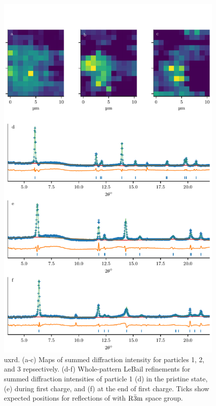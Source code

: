 \documentclass{article}
\begin{document}
\begin{figure}
  \centering
  \includegraphics{figures/NCA-particles-refined.pdf}
  \caption{\nca{} \gls{uxrd}. (a-c) Maps of summed diffraction
    intensity for particles 1, 2, and 3 repsectively. (d-f)
    Whole-pattern LeBail refinements for summed diffraction intensities
    of particle 1 (d) in the pristine state, (e) during first charge,
    and (f) at the end of first charge. Ticks show expected positions
    for reflections of \nca{} with $\rm{R\bar{3}m}$ space group.}
  \label{fig:refinements}
\end{figure}
\end{document}
